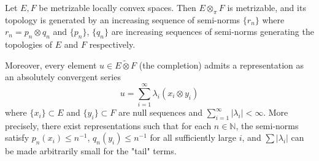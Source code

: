 Let $E, F$ be metrizable locally convex spaces. Then $E \otimes_\pi F$ is metrizable, and its topology is generated by an increasing sequence of semi-norms $\{r_n\}$ where $r_n = p_n \otimes q_n$ and $\{p_n\}$, $\{q_n\}$ are increasing sequences of semi-norms generating the topologies of $E$ and $F$ respectively.

Moreover, every element $u \in E \tilde{\otimes} F$ (the completion) admits a representation as an absolutely convergent series
$$u = \sum_{i=1}^\infty \lambda_i (x_i \otimes y_i)$$
where $\{x_i\} \subset E$ and $\{y_i\} \subset F$ are null sequences and $\sum_{i=1}^\infty |\lambda_i| < \infty$. More precisely, there exist representations such that for each $n \in \mathbb{N}$, the semi-norms satisfy $p_n(x_i) \leq n^{-1}$, $q_n(y_i) \leq n^{-1}$ for all sufficiently large $i$, and $\sum |\lambda_i|$ can be made arbitrarily small for the "tail" terms.
